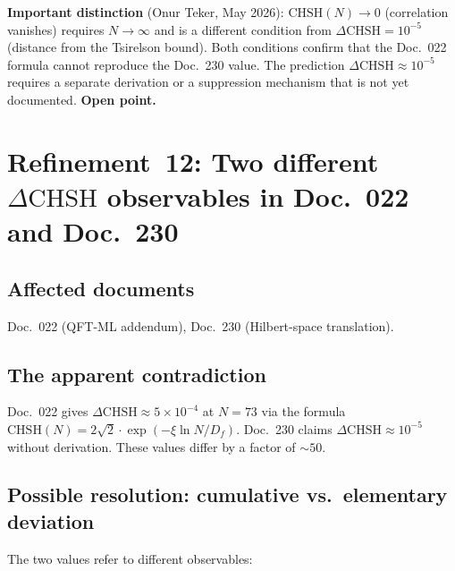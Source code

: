 \textbf{Important distinction} (Onur Teker, May 2026): $\text{CHSH}(N)\to 0$
(correlation vanishes) requires $N\to\infty$ and is a different condition from
$\Delta\text{CHSH}=10^{-5}$ (distance from the Tsirelson bound). Both
conditions confirm that the Doc.~022 formula cannot reproduce the Doc.~230
value. The prediction $\Delta\text{CHSH}\approx 10^{-5}$ requires a separate
derivation or a suppression mechanism that is not yet documented.
\textbf{Open point.}

\section{\texorpdfstring{Refinement~12: Two different $\Delta\text{CHSH}$ observables in Doc.~022 and Doc.~230}{Refinement 12: Two different CHSH observables}}

\subsection*{Affected documents}

Doc.~022 (QFT-ML addendum), Doc.~230 (Hilbert-space translation).

\subsection*{The apparent contradiction}

Doc.~022 gives $\Delta\text{CHSH} \approx 5\times10^{-4}$ at $N=73$ via the
formula $\text{CHSH}(N) = 2\sqrt{2}\cdot\exp(-\xi\ln N/D_f)$. Doc.~230 claims
$\Delta\text{CHSH} \approx 10^{-5}$ without derivation. These values differ by
a factor of $\sim50$.

\subsection*{Possible resolution: cumulative vs.\ elementary deviation}

The two values refer to different observables:

